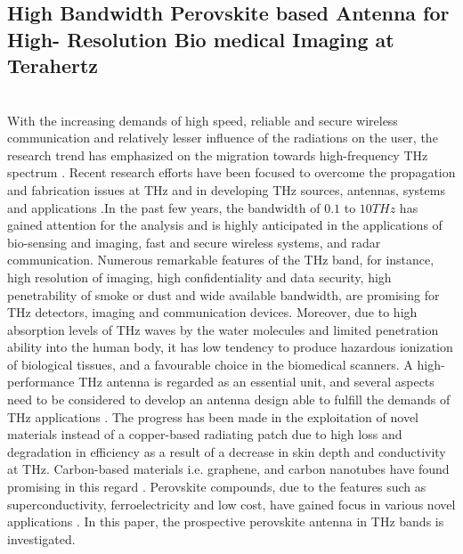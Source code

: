 \documentclass[12pt]{suhbook}
\begin{document}
\subsection{High Bandwidth Perovskite based Antenna for High- Resolution Bio medical Imaging at Terahertz}
 \\With the increasing demands of high speed, reliable and secure wireless communication and relatively lesser influence of the radiations on the user, the research trend has emphasized on the migration towards high-frequency THz spectrum \cite{ghann2017terahertz}\cite{rabbani2017liquid}. Recent research efforts have been focused to overcome the propagation and fabrication issues at THz and in developing THz sources, antennas, systems and applications \cite{siegel2002terahertz}.In the past few years, the bandwidth of $0.1$ to $10THz$ has gained attention for the analysis and is highly anticipated in the applications of bio-sensing and imaging, fast and secure wireless systems, and radar communication\cite{ranzani2013g}\cite{khatib2018response}. Numerous remarkable features of the THz band, for instance, high resolution of imaging, high confidentiality and data security, high penetrability of smoke or dust and wide available bandwidth, are promising for THz detectors, imaging and communication devices. Moreover, due to high absorption levels of THz waves by the water molecules and limited penetration ability into the human body, it has low tendency to produce hazardous ionization of biological tissues, and a favourable choice in the biomedical scanners. A high-performance THz antenna is regarded as an essential unit, and several aspects need to be considered to develop an antenna design able to fulfill the demands of THz applications \cite{chen2016research}. The progress has been made in the exploitation of novel materials instead of a copper-based radiating patch due to high loss and degradation in efficiency as a result of a decrease in skin depth and conductivity at THz. Carbon-based materials i.e. graphene, and carbon nanotubes have found promising in this regard \cite{naghdehforushha2017design}. Perovskite compounds, due to the features such as superconductivity, ferroelectricity and low cost, have gained focus in various novel applications \cite{huang2014low}. In this paper, the prospective perovskite antenna in THz bands is investigated.
\end{document}
